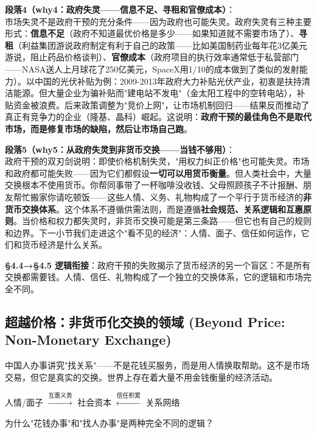 \documentclass[../main.tex]{subfiles}
\begin{document}
	\textbf{段落4（why4：政府失灵——信息不足、寻租和官僚成本）}：\\
	市场失灵不是政府干预的充分条件——因为政府也可能失灵。政府失灵有三种主要形式：\textbf{信息不足}（政府不知道最优价格是多少——如果知道就不需要市场了）、\textbf{寻租}（利益集团游说政府制定有利于自己的政策——比如美国制药业每年花3亿美元游说，阻止药品价格谈判）、\textbf{官僚成本}（政府项目的执行效率通常低于私营部门——NASA送人上月球花了250亿美元，SpaceX用1/10的成本做到了类似的发射能力）。以中国的光伏补贴为例：2009-2013年政府大力补贴光伏产业，初衷是扶持清洁能源。但大量企业为骗补贴而"建电站不发电"（金太阳工程中的空转电站），补贴资金被浪费。后来政策调整为"竞价上网"，让市场机制回归——结果反而推动了真正有竞争力的企业（隆基、晶科）崛起。这说明：\textbf{政府干预的最佳角色不是取代市场，而是修复市场的缺陷，然后让市场自己跑}。

	\textbf{段落5（why5：从政府失灵到非货币交换——当钱不够用）}：\\
	政府干预的双刃剑说明：即使价格机制失灵，"用权力纠正价格"也可能失灵。市场和政府都可能失败——因为它们都假设\textbf{一切可以用货币衡量}。但人类社会中，大量交换根本不使用货币。你帮同事带了一杯咖啡没收钱、父母照顾孩子不计报酬、朋友帮忙搬家你请吃顿饭——这些人情、义务、礼物构成了一个平行于货币经济的\textbf{非货币交换体系}。这个体系不遵循供需法则，而是遵循\textbf{社会规范、关系逻辑和互惠原则}。当价格和权力都失灵时，非货币交换可能是第三条路——但它也有自己的规则和边界。下一小节我们走进这个"看不见的经济"：人情、面子、信任如何运作，它们和货币经济是什么关系。

	\textbf{§4.4→§4.5 逻辑衔接}：政府干预的失败揭示了货币经济的另一个盲区：不是所有交换都需要钱。人情、信任、礼物构成了一个独立的交换体系，它的逻辑和市场完全不同。

	\subsection{超越价格：非货币化交换的领域 (Beyond Price: Non-Monetary Exchange)}
	\begin{motivation}
		中国人办事讲究"找关系"——不是花钱买服务，而是用人情换取帮助。这不是市场交易，但它是真实的交换。世界上存在着大量不用金钱衡量的经济活动。
	\end{motivation}
	\begin{logicmap}
		人情/面子 $\xrightarrow{\text{互惠义务}}$ 社会资本 $\xleftarrow{\text{信任积累}}$ 关系网络
	\end{logicmap}
	\begin{questionbox}
		为什么"花钱办事"和"找人办事"是两种完全不同的逻辑？
	\end{questionbox}
\end{document}
